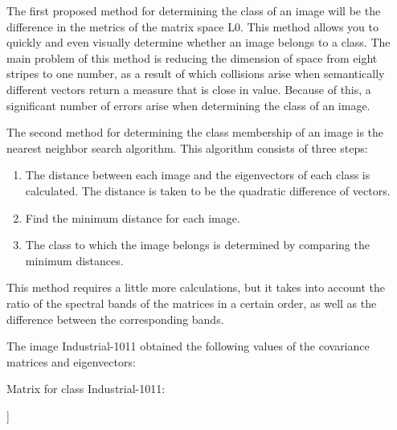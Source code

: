 \documentclass{article}
\begin{document}
\begin{multicols*}{2}
\par The first proposed method for determining the class
of an image will be the difference in the metrics of the
matrix space L0. This method allows you to quickly and
even visually determine whether an image belongs to a
class. The main problem of this method is reducing the
dimension of space from eight stripes to one number,
as a result of which collisions arise when semantically
different vectors return a measure that is close in value.
Because of this, a significant number of errors arise when
determining the class of an image. 
\par The second method for determining the class membership of an image is the nearest neighbor search algorithm.
This algorithm consists of three steps: \vspace{-8pt}

\begin{enumerate}[label=\arabic*)]
    \item  The distance between each image and the eigenvectors of each class is calculated. The distance is
    taken to be the quadratic difference of vectors.\vspace{-6pt}
    \item Find the minimum distance for each image.\vspace{-6pt}
    \item The class to which the image belongs is determined
    by comparing the minimum distances.\vspace{-6pt}
\end{enumerate}

\par This method requires a little more calculations, but
it takes into account the ratio of the spectral bands of
the matrices in a certain order, as well as the difference
between the corresponding bands. 

\par The image Industrial-1011 obtained the following
values of the covariance matrices and eigenvectors: 
\vspace{10pt}

\noindent Matrix for class Industrial-1011: 
\par [[1. 0.982 0.957 0.841 0.136 0.195 0.564 0.774]
\par [0.982 1. 0.975 0.873 0.214 0.275 0.604 0.778]
\par [0.957 0.975 1. 0.899 0.18 0.216 0.63 0.818] 
\par [0.841 0.873 0.899 1. 0.383 0.321 0.816 0.929]
\par [0.136 0.214 0.18 0.383 1. 0.925 0.69 0.36 ] 
\par [0.195 0.275 0.216 0.321 0.925 1. 0.608 0.302]
\par [0.564 0.604 0.63 0.816 0.69 0.608 1. 0.894] 
\par [0.774 0.778 0.818 0.929 0.36 0.302 0.894 1. ]] 
\vspace{10pt}


\end{multicols*}
\end{document}

